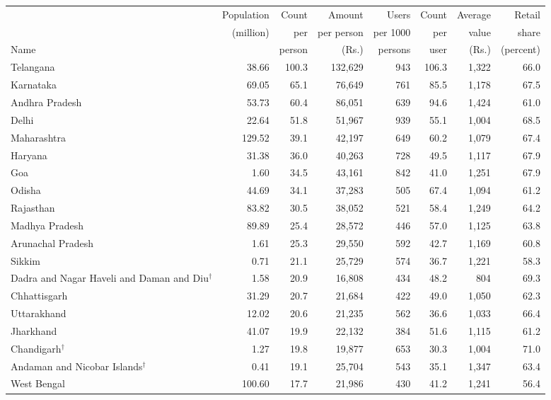 \begin{tabular}{@{}>{\raggedright\arraybackslash}p{2.95cm} r r r r r r r@{}}
\toprule
 & Population & Count & Amount & Users & Count & Average & Retail \\
 & (million) & per & per person & per 1000 & per & value & share \\
Name & & person & (Rs.) & persons & user & (Rs.) & (percent) \\
\midrule
Telangana & 38.66 & 100.3 & 132{,}629 & 943 & 106.3 & 1{,}322 & 66.0 \\
Karnataka & 69.05 & 65.1 & 76{,}649 & 761 & 85.5 & 1{,}178 & 67.5 \\
Andhra Pradesh & 53.73 & 60.4 & 86{,}051 & 639 & 94.6 & 1{,}424 & 61.0 \\
Delhi & 22.64 & 51.8 & 51{,}967 & 939 & 55.1 & 1{,}004 & 68.5 \\
Maharashtra & 129.52 & 39.1 & 42{,}197 & 649 & 60.2 & 1{,}079 & 67.4 \\
Haryana & 31.38 & 36.0 & 40{,}263 & 728 & 49.5 & 1{,}117 & 67.9 \\
Goa & 1.60 & 34.5 & 43{,}161 & 842 & 41.0 & 1{,}251 & 67.9 \\
Odisha & 44.69 & 34.1 & 37{,}283 & 505 & 67.4 & 1{,}094 & 61.2 \\
Rajasthan & 83.82 & 30.5 & 38{,}052 & 521 & 58.4 & 1{,}249 & 64.2 \\
Madhya Pradesh & 89.89 & 25.4 & 28{,}572 & 446 & 57.0 & 1{,}125 & 63.8 \\
Arunachal Pradesh & 1.61 & 25.3 & 29{,}550 & 592 & 42.7 & 1{,}169 & 60.8 \\
Sikkim & 0.71 & 21.1 & 25{,}729 & 574 & 36.7 & 1{,}221 & 58.3 \\
Dadra and Nagar Haveli and Daman and Diu$^\dagger$ & 1.58 & 20.9 & 16{,}808 & 434 & 48.2 & 804 & 69.3 \\
Chhattisgarh & 31.29 & 20.7 & 21{,}684 & 422 & 49.0 & 1{,}050 & 62.3 \\
Uttarakhand & 12.02 & 20.6 & 21{,}235 & 562 & 36.6 & 1{,}033 & 66.4 \\
Jharkhand & 41.07 & 19.9 & 22{,}132 & 384 & 51.6 & 1{,}115 & 61.2 \\
Chandigarh$^\dagger$ & 1.27 & 19.8 & 19{,}877 & 653 & 30.3 & 1{,}004 & 71.0 \\
Andaman and Nicobar Islands$^\dagger$ & 0.41 & 19.1 & 25{,}704 & 543 & 35.1 & 1{,}347 & 63.4 \\
West Bengal & 100.60 & 17.7 & 21{,}986 & 430 & 41.2 & 1{,}241 & 56.4 \\

\end{tabular}
